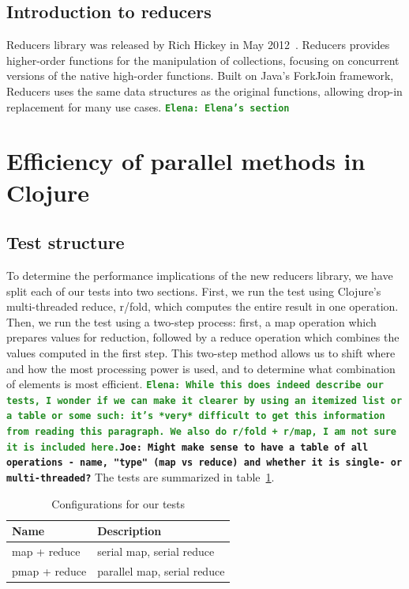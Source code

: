 \documentclass[12pt]{article}
\newcommand{\comment}[1]{{\bf \tt  {#1}}}
\newcommand{\emcomment}[1]{\textcolor{ForestGreen}{\comment{Elena: {#1}}}}
\newcommand{\joecomment}[1]{\textcolor{JoesGold}{\comment{Joe: {#1}}}}
\begin{document}
\subsection{Introduction to reducers}\label{sec:reducers}
Reducers library was released by Rich Hickey in May 2012~\cite{HickeyReducers}. Reducers provides higher-order functions for the manipulation of collections, focusing on concurrent versions of the native high-order functions.  Built on Java's ForkJoin framework, Reducers uses the same data structures as the original functions, allowing drop-in replacement for many use cases.
\emcomment{Elena's section}

\section{Efficiency of parallel methods in Clojure}\label{sec:efficiency} 

\subsection{Test structure}\label{sec:testStruct}
To determine the performance implications of the new reducers library, we have split each of our tests into two sections. First, we run the test using Clojure's multi-threaded reduce, r/fold, which computes the entire result in one operation. Then, we run the test using a two-step process: first, a map operation which prepares values for reduction, followed by a reduce operation which combines the values computed in the first step. This two-step method allows us to shift where and how the most processing power is used, and to determine what combination of elements is most efficient.
\emcomment{While this does indeed describe our tests, I wonder if we can make it clearer by using an itemized list or a table or some such: it's *very* difficult to get this information from reading this paragraph. We also do r/fold + r/map, I am not sure it is included here.}\joecomment{Might make sense to have a table of all operations - name, "type" (map vs reduce) and whether it is single- or multi-threaded?}
The tests are summarized in table~\ref{table:tests}.

\begin{table}
\begin{center}
\begin{tabular}{|l|l|}
\hline 
Name & Description \\
\hline
map + reduce & serial map, serial reduce \\
pmap + reduce & parallel map, serial reduce \\
\hline
\end{tabular}
\end{center}
\caption{Configurations for our tests}\label{table:tests}
\end{table}
\end{document}
